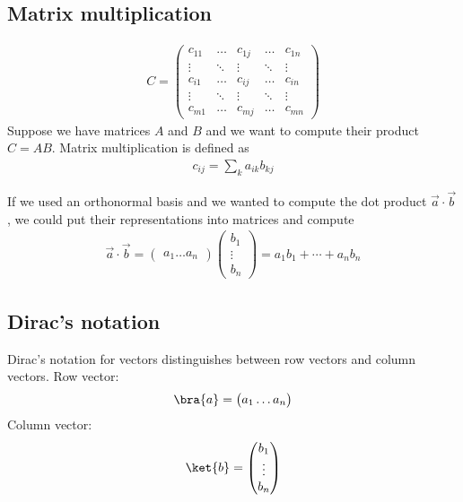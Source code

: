 \documentclass[12pt, oneside, letterpaper, fleqn]{article}
\begin{document}
\subsection{Matrix multiplication}
\begin{align*}
C = \begin{pmatrix}
c_{11} & \hdots & c_{1j} & \hdots & c_{1n}\\
\vdots & \ddots & \vdots & \ddots & \vdots\\
c_{i1} & \hdots & c_{ij} & \hdots & c_{in}\\
\vdots & \ddots & \vdots & \ddots & \vdots\\
c_{m1} & \hdots & c_{mj} & \hdots & c_{mn}
\end{pmatrix}
\end{align*}
Suppose we have matrices $A$ and $B$ and we want to compute their
product $C = AB$. Matrix multiplication is defined as
\begin{align}
c_{ij} = \sum_k a_{ik}b_{kj}
\end{align}

If we used an orthonormal basis and we wanted to compute the dot product
$\vec{a} \cdot \vec{b}$, we could put their representations into
matrices and compute
\begin{align}
\vec{a} \cdot \vec{b} = \begin{pmatrix}
a_1 \hdots a_n
\end{pmatrix}
\begin{pmatrix}
b_1\\
\vdots\\
b_n
\end{pmatrix}
= a_1b_1 + \dotsb + a_nb_n
\end{align}

\subsection{Dirac's notation}
Dirac's notation for vectors distinguishes between row vectors and column
vectors. Row vector:
\begin{align}
\bra{a} = \begin{pmatrix}a_1 \hdots a_n\end{pmatrix}
\end{align}
Column vector:
\begin{align}
\ket{b} = \begin{pmatrix}b_1\\
\vdots\\
b_n
\end{pmatrix}
\end{align}
\end{document}
